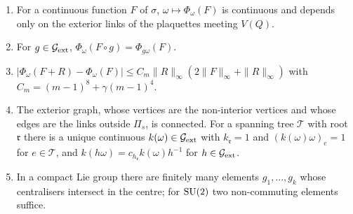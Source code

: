 \begin{lemma}\label{lem:fibre}
\begin{enumerate}[label=\textup{(\roman*)},leftmargin=*]
\item For a continuous function $F$ of $\sigma$, $\omega\mapsto\Phi_\omega(F)$
is continuous and depends only on the exterior links of the plaquettes
meeting $V(Q)$.
\item For $g\in\mathcal G_{\rm ext}$, $\Phi_\omega(F\circ g)=\Phi_{g\omega}(F)$.
\item $|\Phi_\omega(F+R)-\Phi_\omega(F)|\le C_m\|R\|_\infty(2\|F\|_\infty+\|R
\|_\infty)$ with $C_m=(m-1)^8+\gamma(m-1)^4$.
\item The exterior graph, whose vertices are the non-interior vertices and
whose edges are the links outside $\Pi_s$, is connected. For a spanning tree
$\mathcal T$ with root $\mathfrak r$ there is a unique continuous $k(\omega)
\in\mathcal G_{\rm ext}$ with $k_{\mathfrak r}=1$ and $(k(\omega)\omega)_e=1$
for $e\in\mathcal T$, and $k(h\omega)=c_{h_{\mathfrak r}}k(\omega)h^{-1}$ for
$h\in\mathcal G_{\rm ext}$.
\item In a compact Lie group there are finitely many elements $g_1,\dots,
g_k$ whose centralisers intersect in the centre; for $\mathrm{SU}(2)$ two
non-commuting elements suffice.
\end{enumerate}
\end{lemma}

